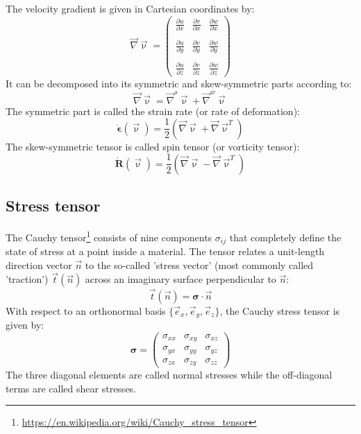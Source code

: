 The velocity gradient is given in Cartesian coordinates by:
\begin{equation}
\vec\nabla\vec\upnu = 
\left(
\begin{array}{ccc}
\frac{\partial u}{\partial x} & \frac{\partial v}{\partial x} & \frac{\partial w}{\partial x} \\\\
\frac{\partial u}{\partial y} & \frac{\partial v}{\partial y} & \frac{\partial w}{\partial y} \\\\
\frac{\partial u}{\partial z} & \frac{\partial v}{\partial z} & \frac{\partial w}{\partial z} 
\end{array}
\right)
\end{equation}
It can be decomposed into its symmetric and skew-symmetric parts according to:
\begin{equation}
\vec\nabla\vec\upnu = \vec\nabla^s\vec\upnu + \vec\nabla^w\vec\upnu
\end{equation}
The symmetric part is called the strain rate (or rate of deformation):
\begin{equation}
\dot{\bm \epsilon}(\vec \upnu) = \frac{1}{2}\left( \vec\nabla\vec\upnu + \vec\nabla\vec\upnu^T \right)
\end{equation}
The skew-symmetric tensor is called spin tensor (or vorticity tensor):
\begin{equation}
\dot{\bm R}(\vec \upnu) = \frac{1}{2}\left( \vec\nabla\vec\upnu - \vec\nabla\vec\upnu^T \right)
\end{equation}

\subsection{Stress tensor}

   

The Cauchy tensor\footnote{\url{https://en.wikipedia.org/wiki/Cauchy_stress_tensor}} 
consists of nine components $\sigma_{ij}$  that completely define the state of stress 
at a point inside a material. 
The tensor relates a unit-length direction vector $\vec{n}$ to the so-called 'stress vector' (most commonly called 'traction') $\vec{t}(\vec{n})$ across an imaginary surface perpendicular to $\vec{n}$:
\[
\vec{t}(\vec n)={\bm \sigma}\cdot {\vec n}
\]
With respect to an orthonormal basis $\{\vec{e}_x,\vec{e}_y,\vec{e}_z\}$, the Cauchy stress tensor
is given by:
\begin{equation}
{\bm \sigma}=
\left(
\begin{array}{ccc}
\sigma_{xx} & \sigma_{xy} & \sigma_{xz} \\
\sigma_{yx} & \sigma_{yy} & \sigma_{yz} \\
\sigma_{zx} & \sigma_{zy} & \sigma_{zz} 
\end{array}
\right)
\end{equation}
The three diagonal elements are called normal stresses while the off-diagonal terms 
are called shear stresses.

